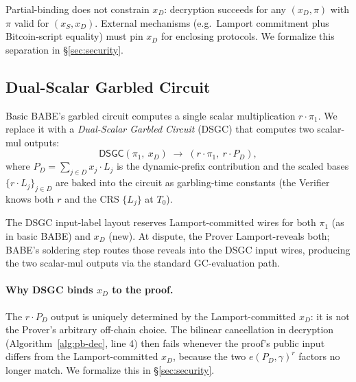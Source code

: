 \documentclass[11pt]{article}
\begin{document}
Partial-binding does not constrain $x_D$: decryption succeeds for
any $(x_D, \pi)$ with $\pi$ valid for $(x_S, x_D)$. External
mechanisms (e.g.\ Lamport commitment plus Bitcoin-script equality)
must pin $x_D$ for enclosing protocols. We formalize this separation
in \S\ref{sec:security}.

\subsection{Dual-Scalar Garbled Circuit}\label{sec:dsgc}

Basic BABE's garbled circuit computes a single scalar multiplication
$r \cdot \pi_1$. We replace it with a \emph{Dual-Scalar Garbled Circuit}
(DSGC) that computes two scalar-mul outputs:
\[
  \mathsf{DSGC}(\pi_1,\ x_D) \;\longrightarrow\; (r \cdot \pi_1,\ r \cdot P_D),
\]
where $P_D = \sum_{j \in D} x_j \cdot L_j$ is the dynamic-prefix
contribution and the scaled bases $\{r \cdot L_j\}_{j \in D}$ are
baked into the circuit as garbling-time constants (the Verifier
knows both $r$ and the CRS $\{L_j\}$ at $T_0$).

The DSGC input-label layout reserves Lamport-committed wires for
both $\pi_1$ (as in basic BABE) and $x_D$ (new). At dispute, the
Prover Lamport-reveals both; BABE's soldering step routes those
reveals into the DSGC input wires, producing the two scalar-mul
outputs via the standard GC-evaluation path.

\paragraph{Why DSGC binds $x_D$ to the proof.}
The $r \cdot P_D$ output is uniquely determined by the
Lamport-committed $x_D$: it is not the Prover's arbitrary off-chain
choice. The bilinear cancellation in decryption
(Algorithm~\ref{alg:pb-dec}, line 4) then fails whenever the proof's
public input differs from the Lamport-committed $x_D$, because the
two $e(P_D, \gamma)^r$ factors no longer match. We formalize this in
\S\ref{sec:security}.
\end{document}
